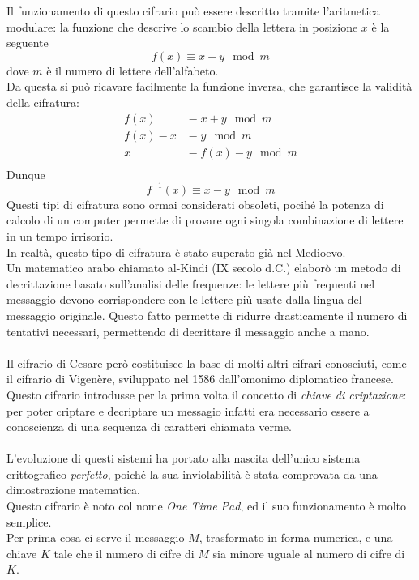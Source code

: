 \documentclass[italian,A4,12pt]{article}
\begin{document}
    Il funzionamento di questo cifrario può essere descritto tramite l'aritmetica modulare: la funzione che descrive lo scambio della lettera in posizione $x$ è la seguente
    $$f(x)\equiv x+y \mod{m}$$
    dove $m$ è il numero di lettere dell'alfabeto.\\
    Da questa si può ricavare facilmente la funzione inversa, che garantisce la validità della cifratura:
    \begin{align*}
      f(x) & \equiv x+y \mod{m}\\
      f(x)-x & \equiv y \mod{m}\\
      x & \equiv f(x)-y \mod{m}\\
    \end{align*}
    Dunque
    $$f^{-1}(x)\equiv x-y \mod{m}$$
    Questi tipi di cifratura sono ormai considerati obsoleti, pocihé la potenza di calcolo di un computer permette di provare ogni singola combinazione di lettere in un tempo irrisorio.\\
    In realtà, questo tipo di cifratura è stato superato già nel Medioevo. \\ Un matematico arabo chiamato al-Kindi (IX secolo d.C.) elaborò un metodo di decrittazione basato sull'analisi delle frequenze: le lettere più frequenti nel messaggio devono corrispondere con le lettere più usate dalla lingua del messaggio originale. Questo fatto permette di ridurre drasticamente il numero di tentativi necessari, permettendo di decrittare il messaggio anche a mano.\\\\
    Il cifrario di Cesare però costituisce la base di molti altri cifrari conosciuti, come il cifrario di Vigenère, sviluppato nel 1586 dall'omonimo diplomatico francese.
    Questo cifrario introdusse per la prima volta il concetto di \textit{chiave di criptazione}: per poter criptare e decriptare un messagio infatti era necessario essere a conoscienza di una sequenza di caratteri chiamata verme.\\\\
    L'evoluzione di questi sistemi ha portato alla nascita dell'unico sistema crittografico \textit{perfetto}, poiché la sua inviolabilità è stata comprovata da una dimostrazione matematica.\\
    Questo cifrario è noto col nome \textit{One Time Pad}, ed il suo funzionamento è molto semplice.\\
    Per prima cosa ci serve il messaggio $M$,  trasformato in forma numerica, e una chiave $K$ tale che il numero di cifre di $M$ sia minore uguale al numero di cifre di $K$.\\
\end{document}
